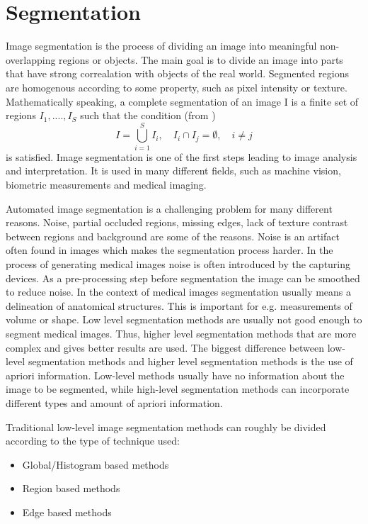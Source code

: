 \section{Segmentation}
Image segmentation is the process of dividing an image into meaningful non-overlapping regions or objects. The main goal is to divide an image into parts that have strong correalation with objects of the real world. Segmented regions are homogenous according to some property, such as pixel intensity or texture. Mathematically speaking, a complete segmentation of an image I is a finite set of regions \(I_1,...., I_S\) such that the condition (from \cite{drung00})
\begin{equation}
I = \bigcup_{i=1}^S I_{i} , \quad I_{i} \cap I_{j} = \emptyset , \quad i \neq j
\label{segCond}
\end{equation}
is satisfied. Image segmentation is one of the first steps leading to image analysis and interpretation. It is used in many different fields, such as machine vision, biometric measurements and medical imaging.

Automated image segmentation is a challenging problem for many different reasons. Noise, partial occluded regions, missing edges, lack of texture contrast between regions and background are some of the reasons. Noise is an artifact often found in images which makes the segmentation process harder. In the process of generating medical images noise is often introduced by the capturing devices. As a pre-processing step before segmentation the image can be smoothed to reduce noise. In the context of medical images segmentation usually means a delineation of anatomical structures. This is important for e.g. measurements of volume or shape. Low level segmentation methods are usually not good enough to segment medical images. Thus, higher level segmentation methods that are more complex and gives better results are used. The biggest difference between low-level segmentation methods and higher level segmentation methods is the use of apriori information. Low-level methods usually have no information about the image to be segmented, while high-level segmentation methods can incorporate different types and amount of apriori information.

Traditional low-level image segmentation methods can roughly be divided according to the type of technique used:
\begin{itemize}
  \item Global/Histogram based methods
  \item Region based methods
  \item Edge based methods
\end{itemize}

